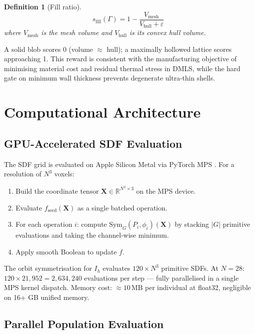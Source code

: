\documentclass[11pt, a4paper]{article}
\newtheorem{definition}{Definition}[section]
\newcommand{\R}{\mathbb{R}}
\newcommand{\card}[1]{\lvert #1 \rvert}
\newcommand{\Ih}{I_h}
\begin{document}
\begin{definition}[Fill ratio]
\[
  s_{\mathrm{fill}}(\Gamma) = 1 - \frac{V_{\mathrm{mesh}}}{V_{\mathrm{hull}} + \varepsilon}
\]
where $V_{\mathrm{mesh}}$ is the mesh volume and $V_{\mathrm{hull}}$ is its
convex hull volume.
\end{definition}

A solid blob scores 0 (volume $\approx$ hull); a maximally hollowed lattice
scores approaching 1. This reward is consistent with the manufacturing
objective of minimising material cost and residual thermal stress in DMLS,
while the hard gate on minimum wall thickness prevents degenerate ultra-thin shells.

\section{Computational Architecture}
\label{sec:compute}

\subsection{GPU-Accelerated SDF Evaluation}

The SDF grid is evaluated on Apple Silicon Metal via PyTorch MPS
\cite{apple_mps}. For a resolution of $N^3$ voxels:

\begin{enumerate}
  \item Build the coordinate tensor $\mathbf{X} \in \R^{N^3 \times 3}$ on the MPS device.
  \item Evaluate $f_{\mathrm{seed}}(\mathbf{X})$ as a single batched operation.
  \item For each operation $i$: compute $\mathrm{Sym}_G(P_i, \phi_i)(\mathbf{X})$ by stacking
        $\card{G}$ primitive evaluations and taking the channel-wise minimum.
  \item Apply smooth Boolean to update $f$.
\end{enumerate}

The orbit symmetrisation for $\Ih$ evaluates $120 \times N^3$ primitive SDFs.
At $N=28$: $120 \times 21{,}952 = 2{,}634{,}240$ evaluations per step — fully
parallelised in a single MPS kernel dispatch. Memory cost: $\approx 10\,\mathrm{MB}$
per individual at float32, negligible on 16+ GB unified memory.

\subsection{Parallel Population Evaluation}
\end{document}
